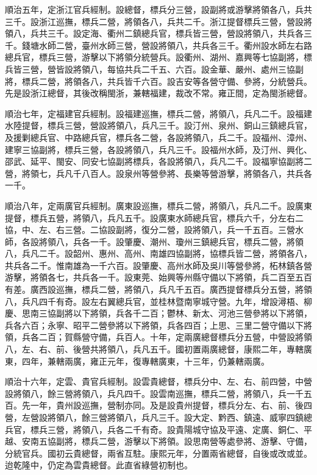 \begin{pinyinscope}
順治五年，定浙江官兵經制。設總督，標兵分三營，設副將或游擊將領各八，兵共三千。設浙江巡撫，標兵二營，將領各八，兵共二千。浙江提督標兵三營，營設將領八，兵共三千。設定海、衢州二鎮總兵官，標兵皆三營，營設將領八，共兵各三千。錢塘水師二營，臺州水師三營，營設將領八，共兵各三千。衢州設水師左右路總兵官，標兵三營，游擊以下將領分統營兵。設衢州、湖州、嘉興等七協副將，標兵皆三營，營皆設將領八，每協共兵二千五、六百。設金華、嚴州、處州三協副將，標兵二營，將領各八，共兵皆千六百。設吉安等各營守備、參將，分統營兵。先是設浙江總督，其後改稱閩浙，兼轄福建，裁改不常。雍正間，定為閩浙總督。

順治七年，定福建官兵經制。設福建巡撫，標兵二營，將領八，兵凡二千。設福建水陸提督，標兵三營，營設將領八，兵凡三千。設汀州、泉州、銅山三鎮總兵官，及援剿總兵官、中路總兵官，標兵各二營，各設將領八，兵二千。設福州、漳州、建寧三協副將，標兵三營，各設將領八，兵凡三千。設福州水師，及汀州、興化、邵武、延平、閩安、同安七協副將標兵，各設將領八，兵凡二千。設福寧協副將二營，將領七，兵凡千八百人。設泉州等營參將、長樂等營游擊，將領各八，共兵各一千。

順治八年，定兩廣官兵經制。廣東設巡撫，標兵二營，將領八，兵凡二千。設廣東提督，標兵五營，將領八，兵凡五千。設廣東水師總兵官，標兵六千，分左右二協，中、左、右三營。二協設副將，復分二營，設將領八，兵一千五百。三營水師，各設將領八，兵各一千。設肇慶、潮州、瓊州三鎮總兵官，標兵二營，將領八，兵凡二千。設韶州、惠州、高州、南雄四協副將，協標兵皆二營，將領各八，共兵各二千。惟南雄為一千六百。設肇慶、高州水師及吳川等營參將，柘林鎮各營游擊，將領各七，共兵各一千。設東莞、始興等州縣守備以下將領，兵二百至五百有差。廣西設巡撫，標兵二營，將領八，兵凡千五百。廣西提督標兵分五營，將領八，兵凡四千有奇。設左右翼總兵官，並桂林暨南寧城守營。九年，增設潯梧、柳慶、思南三協副將以下將領，兵各千二百；鬱林、新太、河池三營參將以下將領，兵各六百；永寧、昭平二營參將以下將領，兵各四百；上思、三里二營守備以下將領，兵各二百；賀縣營守備，兵百人。十年，定兩廣總督標兵分五營，中營設將領八，左、右、前、後營共將領八，兵凡五千。國初置兩廣總督，康熙二年，專轄廣東，四年，兼轄兩廣，雍正元年，復專轄廣東，十三年，仍兼轄兩廣。

順治十六年，定雲、貴官兵經制。設雲貴總督，標兵分中、左、右、前四營，中營設將領八，餘三營將領八，兵凡四千。設雲南巡撫，標兵二營，將領八，兵一千五百。先一年，貴州設巡撫，營制亦同。及是設貴州提督，標兵分左、右、前、後四營，左營設將領八，餘三營將領八，兵凡三千。設大定、黔西、鎮遠、威寧四鎮總兵官，標兵三營，將領八，兵各二千有奇。設貴陽城守協及平遠、定廣、銅仁、平越、安南五協副將，標兵二營，游擊以下將領。設思南營等處參將、游擊、守備，分統官兵。國初云貴總督，兩省互駐。康熙元年，分置兩省總督，自後或改或並。迨乾隆中，仍定為雲貴總督。此直省綠營初制也。


\end{pinyinscope}
